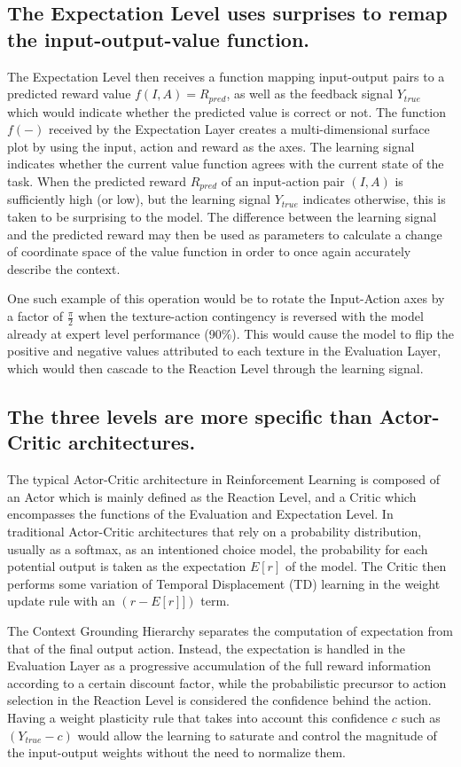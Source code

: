 \documentclass[11pt]{article}
\begin{document}
\subsection{The Expectation Level uses surprises to remap the input-output-value function.}
The Expectation Level then receives a function mapping input-output pairs to a predicted reward value $f(I, A) = R_{pred}$, as well as the feedback signal $Y_{true}$ which would indicate whether the predicted value is correct or not.  The function $f(-)$ received by the Expectation Layer creates a multi-dimensional surface plot by using the input, action and reward as the axes.  The learning signal indicates whether the current value function agrees with the current state of the task.  When the predicted reward $R_{pred}$ of an input-action pair $(I, A)$ is sufficiently high (or low), but the learning signal $Y_{true}$ indicates otherwise, this is taken to be surprising to the model.  The difference between the learning signal and the predicted reward may then be used as parameters to calculate a change of coordinate space of the value function in order to once again accurately describe the context.  

One such example of this operation would be to rotate the Input-Action axes by a factor of $\frac{\pi}{2}$ when the texture-action contingency is reversed with the model already at expert level performance (90\%).  This would cause the model to flip the positive and negative values attributed to each texture in the Evaluation Layer, which would then cascade to the Reaction Level through the learning signal.

\subsection{The three levels are more specific than Actor-Critic architectures.}

The typical Actor-Critic architecture in Reinforcement Learning is composed of an Actor which is mainly defined as the Reaction Level, and a Critic which encompasses the functions of the Evaluation and Expectation Level.  In traditional Actor-Critic architectures that rely on a probability distribution, usually as a softmax, as an intentioned choice model, the probability for each potential output is taken as the expectation $E[r]$ of the model.  The Critic then performs some variation of Temporal Displacement (TD) learning in the weight update rule with an $(r - E[r]])$ term.  

The Context Grounding Hierarchy separates the computation of expectation from that of the final output action.  Instead, the expectation is handled in the Evaluation Layer as a progressive accumulation of the full reward information according to a certain discount factor, while the probabilistic precursor to action selection in the Reaction Level is considered the confidence behind the action.  Having a weight plasticity rule that takes into account this confidence $c$ such as $(Y_{true} - c)$ would allow the learning to saturate and control the magnitude of the input-output weights without the need to normalize them.
\end{document}
